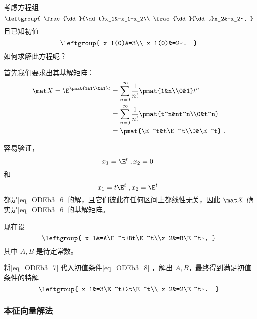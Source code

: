 \begin{example}{}
考虑方程组
\begin{equation}\label{eq_ODEb3_6}
\leftgroup{
    \frac{\dd}{\dd t}x_1&=x_1+x_2\\
    \frac{\dd}{\dd t}x_2&=x_2~,
}
\end{equation}
且已知初值
\begin{equation}\label{eq_ODEb3_8}
\leftgroup{
    x_1(0)&=3\\
    x_1(0)&=2~.
}
\end{equation}
如何求解此方程呢？

首先我们要求出其基解矩阵：
\begin{equation}
\begin{aligned}
\mat X=\E^{\pmat{1&1\\0&1}t}&=\sum_{n=0}^\infty\frac{1}{n!}\pmat{1&n\\0&1}t^n\\
&=\sum_{n=0}^\infty\frac{1}{n!}\pmat{t^n&nt^n\\0&t^n}\\
&=\pmat{\E^t&t\E^t\\0&\E^t}~.
\end{aligned}
\end{equation}

容易验证，
\begin{equation}
x_1=\E^t~, x_2=0~
\end{equation}
和
\begin{equation}
x_1=t\E^t~, x_2=\E^t~
\end{equation}
都是\autoref{eq_ODEb3_6} 的解，且它们彼此在任何区间上都线性无关，因此 $\mat X$ 确实是\autoref{eq_ODEb3_6} 的基解矩阵。

现在设
\begin{equation}\label{eq_ODEb3_7}
\leftgroup{
x_1&=A\E^t+Bt\E^t\\x_2&=B\E^t~,
}
\end{equation}
其中 $A, B$ 是待定常数。

将\autoref{eq_ODEb3_7} 代入初值条件\autoref{eq_ODEb3_8} ，解出 $A, B$，最终得到满足初值条件的特解
\begin{equation}
\leftgroup{
    x_1&=3\E^t+2t\E^t\\
    x_2&=2\E^t~.
}
\end{equation}


\end{example}

\subsubsection{本征向量解法}

